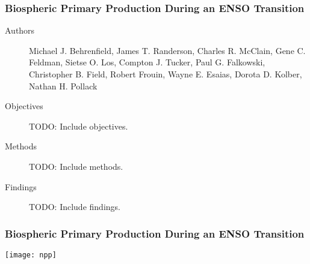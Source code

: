 \begin{frame}\frametitle{Biospheric Primary Production During an ENSO Transition} 

\begin{description}
    \item[Authors] Michael J. Behrenfield, James T. Randerson, Charles R. McClain, Gene C. Feldman, Sietse O. Los, Compton J. Tucker, Paul G. Falkowski, Christopher B. Field, Robert Frouin, Wayne E. Esaias, Dorota D. Kolber, Nathan H. Pollack
    \item[Objectives] TODO: Include objectives.
    \item[Methods] TODO: Include methods.
    \item[Findings] TODO: Include findings.
\end{description}

\end{frame}

\begin{frame}\frametitle{Biospheric Primary Production During an ENSO Transition} 
    \begin{center}
        \texttt{[image: npp]}
    \end{center}
\end{frame}
